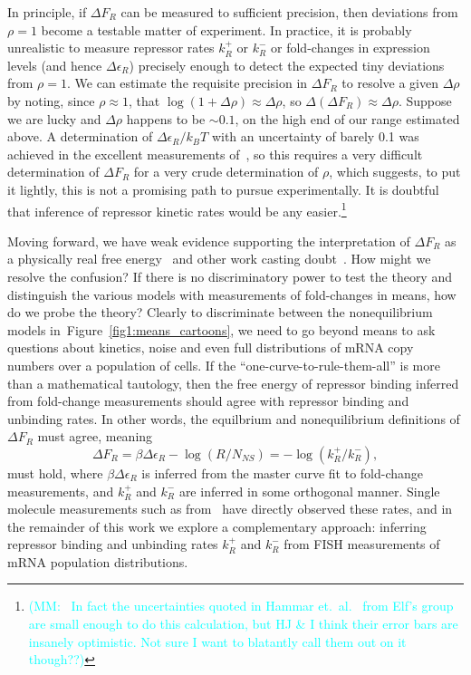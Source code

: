 \documentclass[12pt]{article}%
\newcommand{\mmnote}[1]{\textcolor{cyan}{(MM:~#1)}}
\newcommand{\fig}[1]{Figure~\ref{#1}}
\begin{document}
In principle, if $\Delta F_R$ can be measured to sufficient
precision, then deviations from $\rho=1$ become a
testable matter of experiment.
In practice, it is probably unrealistic to measure repressor
rates $k_R^+$ or $k_R^-$ or fold-changes in expression levels
(and hence $\Delta\epsilon_R$) precisely enough to detect the
expected tiny deviations from $\rho=1$.
We can estimate the
requisite precision in $\Delta F_R$ to resolve a given
$\Delta\rho$ by noting, since $\rho\approx1$, that
$\log(1+\Delta\rho)\approx \Delta\rho$, so
$\Delta(\Delta F_R) \approx \Delta\rho$.
Suppose we are lucky and $\Delta\rho$ happens to be $\sim0.1$, on
the high end of our range estimated above.
A determination of $\Delta\epsilon_R/k_BT$ with an uncertainty of
barely 0.1 was achieved in the excellent measurements
of~\cite{Razo-Mejia2018}, so this requires a very difficult
determination of $\Delta F_R$ for a very crude determination of $\rho$,
which suggests, to put it lightly, this is not a
promising path to pursue experimentally.
It is doubtful that inference of repressor kinetic rates
would be any easier.\footnote{
\mmnote{
In fact the uncertainties quoted in Hammar et.\
al.~\cite{Hammar2014} from Elf's group are small enough to do
this calculation, but HJ \& I think their error bars are insanely
optimistic. Not sure I want to blatantly call them out on it though??}
}

Moving forward, we have weak evidence supporting the
interpretation of $\Delta F_R$ as a physically real free
energy~\cite{Landman2019} and other work casting
doubt~\cite{Hammar2014}.
How might we resolve the confusion?
If there is no discriminatory power to test the theory and
distinguish the various models with measurements of fold-changes
in means, how do we probe the theory? Clearly to discriminate
between the nonequilibrium models in~\fig{fig1:means_cartoons},
we need to go beyond means to ask questions about kinetics, noise and even
full distributions of mRNA copy numbers over a population of cells.
If the ``one-curve-to-rule-them-all'' is more than a
mathematical tautology, then the free energy of repressor binding
inferred from fold-change measurements should agree with
repressor binding and unbinding rates.
In other words, the equilbrium and nonequilibrium definitions of
$\Delta F_R$ must agree, meaning
\begin{equation}
\Delta F_R = \beta\Delta\epsilon_R - \log(R/N_{NS})
        = - \log(k_R^+/k_R^-),
\end{equation}
must hold, where $\beta\Delta\epsilon_R$ is inferred from the
master curve fit to fold-change measurements, and $k_R^+$ and
$k_R^-$ are inferred in some orthogonal manner.
Single molecule measurements such as from~\cite{Hammar2014} have
directly observed these rates, and in the remainder of this work
we explore a complementary approach: inferring repressor binding
and unbinding rates $k_R^+$ and $k_R^-$ from FISH measurements of
mRNA population distributions.
\end{document}
